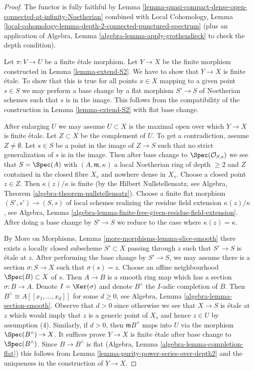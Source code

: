 \begin{proof}
The functor is fully faithful by
Lemma \ref{lemma-quasi-compact-dense-open-connected-at-infinity-Noetherian}
combined with Local Cohomology,
Lemma \ref{local-cohomology-lemma-depth-2-connected-punctured-spectrum}
(plus an application of
Algebra, Lemma \ref{algebra-lemma-apply-grothendieck}
to check the depth condition).

\medskip\noindent
Let $\pi : V \to U$ be a finite \'etale morphism. Let $Y \to X$
be the finite morphism constructed in Lemma \ref{lemma-extend-S2}.
We have to show that $Y \to X$ is finite \'etale.
To show that this is true for all points $x \in X$ mapping to a
given point $s \in S$ we may perform a base change by a flat
morphism $S' \to S$ of Noetherian schemes such that $s$ is
in the image. This follows from the compatibility of the
construction in Lemma \ref{lemma-extend-S2} with flat base change.

\medskip\noindent
After enlarging $U$ we may assume $U \subset X$ is
the maximal open over which $Y \to X$ is finite \'etale.
Let $Z \subset X$ be the complement of $U$.
To get a contradiction, assume $Z \not = \emptyset$.
Let $s \in S$ be a point in the image of $Z \to S$
such that no strict generalization of $s$ is in the image.
Then after base change to $\Spec(\mathcal{O}_{S, s})$
we see that $S = \Spec(A)$ with $(A, \mathfrak m, \kappa)$
a local Noetherian ring of depth $\geq 2$ and $Z$
contained in the closed fibre $X_s$
and nowhere dense in $X_s$. Choose a closed point $z \in Z$.
Then $\kappa(z)/\kappa$ is finite (by the Hilbert Nullstellensatz, see
Algebra, Theorem \ref{algebra-theorem-nullstellensatz}).
Choose a finite flat morphism $(S', s') \to (S, s)$ of local schemes
realizing the residue field extension $\kappa(z)/\kappa$, see
Algebra, Lemma \ref{algebra-lemma-finite-free-given-residue-field-extension}.
After doing a base change by $S' \to S$ we reduce to the case
where $\kappa(z) = \kappa$.

\medskip\noindent
By More on Morphisms, Lemma \ref{more-morphisms-lemma-slice-smooth}
there exists a locally closed subscheme $S' \subset X$ passing through $z$
such that $S' \to S$ is \'etale at $z$. After performing the base change
by $S' \to S$, we may assume there is a section $\sigma : S \to X$
such that $\sigma(s) = z$. Choose an affine neighbourhood
$\Spec(B) \subset X$ of $s$. Then $A \to B$ is a smooth ring
map which has a section $\sigma : B \to A$. Denote $I = \Ker(\sigma)$
and denote $B^\wedge$ the $I$-adic completion of $B$.
Then $B^\wedge \cong A[[x_1, \ldots, x_d]]$ for some $d \geq 0$, see
Algebra, Lemma \ref{algebra-lemma-section-smooth}.
Observe that $d > 0$ since otherwise we see that $X \to S$
is \'etale at $z$ which would imply that $z$ is a generic point of
$X_s$ and hence $z \in U$ by assumption (4).
Similarly, if $d > 0$, then $\mathfrak m B^\wedge$ maps into
$U$ via the morphism $\Spec(B^\wedge) \to X$.
It suffices prove $Y \to X$ is finite \'etale after base change
to $\Spec(B^\wedge)$. Since $B \to B^\wedge$ is flat
(Algebra, Lemma \ref{algebra-lemma-completion-flat})
this follows from Lemma \ref{lemma-purity-power-series-over-depth2}
and the uniqueness in the construction of $Y \to X$.
\end{proof}

